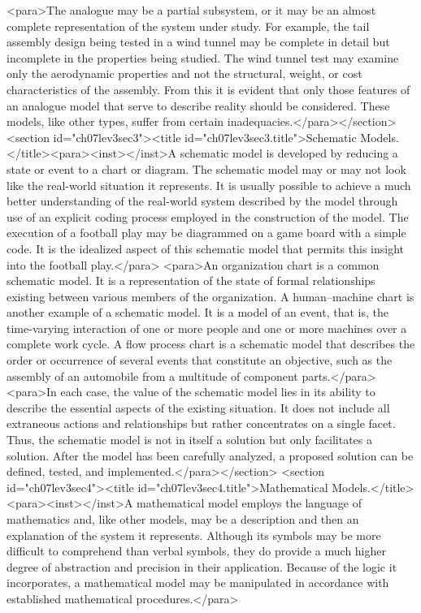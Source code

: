<para>The analogue may be a partial subsystem, or it may be an almost complete representation of the system under study. For example, the tail assembly design being tested in a wind tunnel may be complete in detail but incomplete in the properties being studied. The wind tunnel test may examine only the aerodynamic properties and not the structural, weight, or cost characteristics of the assembly. From this it is evident that only those features of an analogue model that serve to describe reality should be considered. These models, like other types, suffer from certain inadequacies.</para></section>
<section id="ch07lev3sec3"><title id="ch07lev3sec3.title">Schematic Models.</title><para><inst></inst>A schematic model is developed by reducing a state or event to a chart or diagram. The schematic model may or may not look like the real-world situation it represents. It is usually possible to achieve a much better understanding of the real-world system described by the model through use of an explicit coding process employed in the construction of the model. The execution of a football play may be diagrammed on a game board with a simple code. It is the idealized aspect of this schematic model that permits this insight into the football play.</para>
<para>An organization chart is a common schematic model. It is a representation of the state of formal relationships existing between various members of the organization. A human–machine chart is another example of a schematic model. It is a model of an event, that is, the time-varying interaction of one or more people and one or more machines over a complete work cycle. A flow process chart is a schematic model that describes the order or occurrence of several events that constitute an objective, such as the assembly of an automobile from a multitude of component parts.</para>
<para>In each case, the value of the schematic model lies in its ability to describe the essential aspects of the existing situation. It does not include all extraneous actions and relationships but rather concentrates on a single facet. Thus, the schematic model is not in itself a solution but only facilitates a solution. After the model has been carefully analyzed, a proposed solution can be defined, tested, and implemented.</para></section>
<section id="ch07lev3sec4"><title id="ch07lev3sec4.title">Mathematical Models.</title><para><inst></inst>A mathematical model employs the language of mathematics and, like other models, may be a description and then an explanation of the system it represents. Although its symbols may be more difficult to comprehend than verbal symbols, they do provide a much higher degree of abstraction and precision in their application. Because of the logic it incorporates, a mathematical model may be manipulated in accordance with established mathematical procedures.</para>

